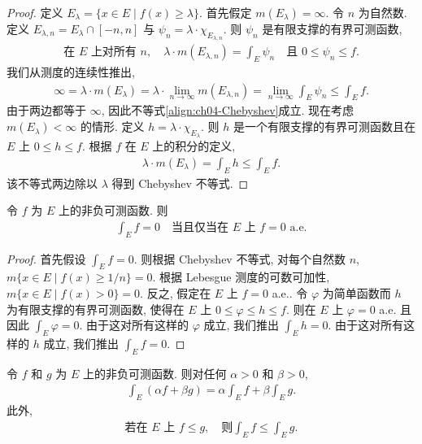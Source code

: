 \documentclass[../../main.tex]{subfiles}
\begin{document}
\begin{proof}
定义 $E_{\lambda}=\{x\in E\mid f(x)\geqslant\lambda\}$. 首先假定 $m(E_{\lambda})=\infty$. 令 $n$ 为自然数. 定义 $E_{\lambda,n}=E_{\lambda}\cap[-n,n]$ 与 $\psi_{n}=\lambda\cdot\chi_{E_{\lambda,n}}$. 则 $\psi_{n}$ 是有限支撑的有界可测函数,
\begin{align*}
\text{在 }E\text{ 上对所有 }n,\quad\lambda\cdot m(E_{\lambda,n})=\int_{E}\psi_{n}\quad\text{且 }0\leqslant\psi_{n}\leqslant f.
\end{align*}
我们从测度的连续性推出,
\begin{align*}
\infty=\lambda\cdot m(E_{\lambda})=\lambda\cdot\lim_{n\to\infty}m(E_{\lambda,n})=\lim_{n\to\infty}\int_{E}\psi_{n}\leqslant\int_{E}f.
\end{align*}
由于两边都等于 $\infty$, 因此不等式\eqref{align:ch04-Chebyshev}成立. 现在考虑 $m(E_{\lambda})<\infty$ 的情形. 定义 $h=\lambda\cdot\chi_{E_{\lambda}}$. 则 $h$ 是一个有限支撑的有界可测函数且在 $E$ 上 $0\leqslant h\leqslant f$. 根据 $f$ 在 $E$ 上的积分的定义,
\begin{align*}
\lambda\cdot m(E_{\lambda})=\int_{E}h\leqslant\int_{E}f.
\end{align*}
该不等式两边除以 $\lambda$ 得到 Chebyshev 不等式.
\end{proof}

\begin{proposition}\label{proposition:ch04-积分为零}
令 $f$ 为 $E$ 上的非负可测函数. 则
\begin{align}
\int_{E}f=0\quad\text{当且仅当在 }E\text{ 上 }f=0\text{ a.e.}\label{align:ch04-积分为零}
\end{align}
\end{proposition}

\begin{proof}
首先假设 $\int_{E}f=0$. 则根据 Chebyshev 不等式, 对每个自然数 $n$, $m\{x\in E\mid f(x)\geqslant 1/n\}=0$. 根据 Lebesgue 测度的可数可加性, $m\{x\in E\mid f(x)>0\}=0$. 反之, 假定在 $E$ 上 $f=0$ a.e.. 令 $\varphi$ 为简单函数而 $h$ 为有限支撑的有界可测函数, 使得在 $E$ 上 $0\leqslant\varphi\leqslant h\leqslant f$. 则在 $E$ 上 $\varphi=0$ a.e. 且因此 $\int_{E}\varphi=0$. 由于这对所有这样的 $\varphi$ 成立, 我们推出 $\int_{E}h=0$. 由于这对所有这样的 $h$ 成立, 我们推出 $\int_{E}f=0$.
\end{proof}

\begin{theorem}[积分的线性与单调性]\label{theorem:ch04-非负积分线性}
令 $f$ 和 $g$ 为 $E$ 上的非负可测函数. 则对任何 $\alpha>0$ 和 $\beta>0$,
\begin{align}
\int_{E}(\alpha f+\beta g)=\alpha\int_{E}f+\beta\int_{E}g.\label{align:ch04-非负线性}
\end{align}
此外,
\begin{align}
\text{若在 }E\text{ 上 }f\leqslant g,\quad\text{则}\int_{E}f\leqslant\int_{E}g.\label{align:ch04-非负单调}
\end{align}
\end{theorem}
\end{document}
